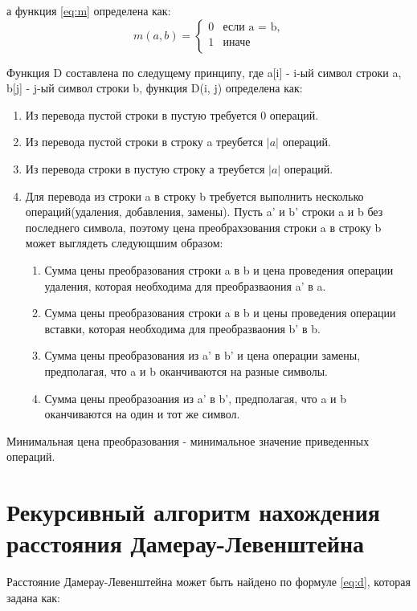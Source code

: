 а функция \ref{eq:m} определена как:
\begin{equation}
    \label{eq:m}
    m(a, b) = \begin{cases}
        0 & \text{если a = b,}\\
        1 & \text{иначе}\\
    \end{cases}
\end{equation}

Функция D составлена по следущему принципу, где a[i] - i-ый символ строки a,
b[j] - j-ый символ строки b, функция D(i, j) определена как:
\begin{enumerate}
    \item Из перевода пустой строки в пустую требуется 0 операций.
    \item Из перевода пустой строки в строку a треубется $|a|$ операций.
    \item Из перевода строки в пустую строку а треубется $|a|$ операций.
    \item Для перевода из строки a в строку b требуется выполнить 
    несколько операций(удаления, добавления, замены). Пусть a' и b' строки 
    a и b без последнего символа, поэтому цена преобрахзования строки a в строку b 
    может выглядеть следующшим образом:
    \begin{enumerate}[label=\alph*)]
        \item Сумма цены преобразования строки a в b и цена проведения операции
        удаления, которая необходима для преобразваония a' в a.
        \item Сумма цены преобразования строки a в b и цены проведения операции
        вставки, которая необходима для преобразваония b' в b.
        \item Сумма цены преобразования из a' в b' и цена операции замены, 
        предполагая, что a и b оканчиваются на разные символы.
        \item Сумма цены преобразоания из a' в b', предполагая, что a и b оканчиваются 
        на один и тот же символ.
    \end{enumerate}
\end{enumerate}

Минимальная цена преобразования - минимальное значение приведенных операций.

\section{Рекурсивный алгоритм нахождения расстояния Дамерау-Левенштейна}
Расстояние Дамерау-Левенштейна может быть найдено по формуле \ref{eq:d}, которая 
задана как:

